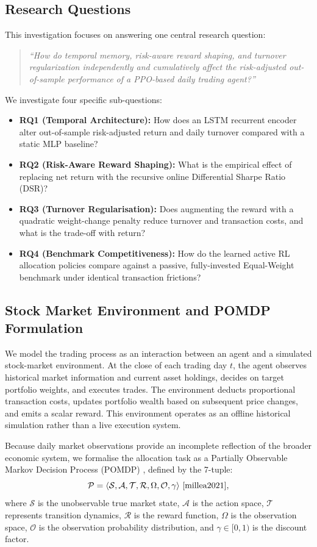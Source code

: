 \documentclass[11pt,a4paper]{article}
\numberwithin{equation}{section}
\numberwithin{table}{section}
\numberwithin{figure}{section}
\numberwithin{algorithm}{section}
\begin{document}
\subsection{Research Questions}
This investigation focuses on answering one central research question:
\begin{quote}\itshape
``How do temporal memory, risk-aware reward shaping, and turnover regularization independently and cumulatively affect the risk-adjusted out-of-sample performance of a PPO-based daily trading agent?''
\end{quote}
We investigate four specific sub-questions:
\begin{itemize}
\item \textbf{RQ1 (Temporal Architecture):} How does an LSTM recurrent encoder alter out-of-sample risk-adjusted return and daily turnover compared with a static MLP baseline?
\item \textbf{RQ2 (Risk-Aware Reward Shaping):} What is the empirical effect of replacing net return with the recursive online Differential Sharpe Ratio (DSR)?
\item \textbf{RQ3 (Turnover Regularisation):} Does augmenting the reward with a quadratic weight-change penalty reduce turnover and transaction costs, and what is the trade-off with return?
\item \textbf{RQ4 (Benchmark Competitiveness):} How do the learned active RL allocation policies compare against a passive, fully-invested Equal-Weight benchmark under identical transaction frictions?
\end{itemize}

\subsection{Stock Market Environment and POMDP Formulation}
We model the trading process as an interaction between an agent and a simulated stock-market environment. At the close of each trading day $t$, the agent observes historical market information and current asset holdings, decides on target portfolio weights, and executes trades. The environment deducts proportional transaction costs, updates portfolio wealth based on subsequent price changes, and emits a scalar reward. This environment operates as an offline historical simulation rather than a live execution system.

Because daily market observations provide an incomplete reflection of the broader economic system, we formalise the allocation task as a Partially Observable Markov Decision Process (POMDP) \cite{millea2021}, defined by the 7-tuple:
\begin{equation}
\mathcal{P}=\langle\mathcal{S},\mathcal{A},\mathcal{T},\mathcal{R},\Omega,\mathcal{O},\gamma\rangle\ \cite{millea2021},
\end{equation}
where $\mathcal{S}$ is the unobservable true market state, $\mathcal{A}$ is the action space, $\mathcal{T}$ represents transition dynamics, $\mathcal{R}$ is the reward function, $\Omega$ is the observation space, $\mathcal{O}$ is the observation probability distribution, and $\gamma\in[0,1)$ is the discount factor.
\end{document}
